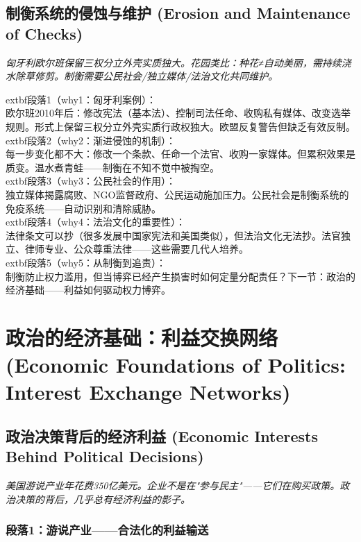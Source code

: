 \documentclass[a4paper,12pt]{book}
\newenvironment{motivation}{\begin{tcolorbox}[colback=gray!10,colframe=gray!60,title=\textit{本章动机},fonttitle=\bfseries,arc=0mm,leftrule=3mm]\small\itshape}{\end{tcolorbox}}
\begin{document}
\begin{motivation}
\begin{motivation}
\begin{motivation}
	\subsection{制衡系统的侵蚀与维护 (Erosion and Maintenance of Checks)}
	\begin{motivation}匈牙利欧尔班保留三权分立外壳实质独大。花园类比：种花≠自动美丽，需持续浇水除草修剪。制衡需要公民社会/独立媒体/法治文化共同维护。\end{motivation}
		extbf{段落1（why1：匈牙利案例）}：\\欧尔班2010年后：修改宪法（基本法）、控制司法任命、收购私有媒体、改变选举规则。形式上保留三权分立外壳实质行政权独大。欧盟反复警告但缺乏有效反制。\\	extbf{段落2（why2：渐进侵蚀的机制）}：\\每一步变化都不大：修改一个条款、任命一个法官、收购一家媒体。但累积效果是质变。温水煮青蛙——制衡在不知不觉中被掏空。\\	extbf{段落3（why3：公民社会的作用）}：\\独立媒体揭露腐败、NGO监督政府、公民运动施加压力。公民社会是制衡系统的免疫系统——自动识别和清除威胁。\\	extbf{段落4（why4：法治文化的重要性）}：\\法律条文可以抄（很多发展中国家宪法和美国类似），但法治文化无法抄。法官独立、律师专业、公众尊重法律——这些需要几代人培养。\\	extbf{段落5（why5：从制衡到追责）}：\\制衡防止权力滥用，但当博弈已经产生损害时如何定量分配责任？下一节：政治的经济基础——利益如何驱动权力博弈。


	\section{政治的经济基础：利益交换网络 (Economic Foundations of Politics: Interest Exchange Networks)}

	\subsection{政治决策背后的经济利益 (Economic Interests Behind Political Decisions)}
	\begin{motivation}
		美国游说产业年花费350亿美元。企业不是在"参与民主"——它们在购买政策。政治决策的背后，几乎总有经济利益的影子。
	\end{motivation}

	\subsubsection*{段落1：游说产业——合法化的利益输送}


\end{motivation}
\end{motivation}
\end{motivation}
\end{document}
